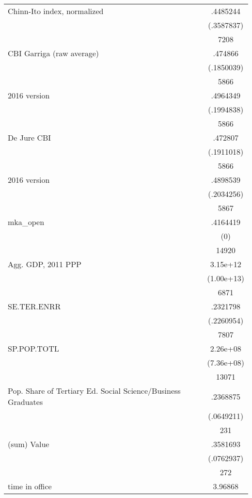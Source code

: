 {\begin{longtable}{l*{1}{c}}
Chinn-Ito index, normalized&    .4485244\\
                    &  (.3587837)\\
                    &        7208\\
CBI Garriga (raw average)&     .474866\\
                    &  (.1850039)\\
                    &        5866\\
2016 version        &    .4964349\\
                    &  (.1994838)\\
                    &        5866\\
De Jure CBI         &     .472807\\
                    &  (.1911018)\\
                    &        5866\\
2016 version        &    .4898539\\
                    &  (.2034256)\\
                    &        5867\\
mka\_open            &    .4164419\\
                    &         (0)\\
                    &       14920\\
Agg. GDP, 2011 PPP  &    3.15e+12\\
                    &  (1.00e+13)\\
                    &        6871\\
SE.TER.ENRR         &    .2321798\\
                    &  (.2260954)\\
                    &        7807\\
SP.POP.TOTL         &    2.26e+08\\
                    &  (7.36e+08)\\
                    &       13071\\
Pop. Share of Tertiary Ed. Social Science/Business Graduates&    .2368875\\
                    &  (.0649211)\\
                    &         231\\
(sum) Value         &    .3581693\\
                    &  (.0762937)\\
                    &         272\\
time in office      &     3.96868\\

\end{longtable}}
